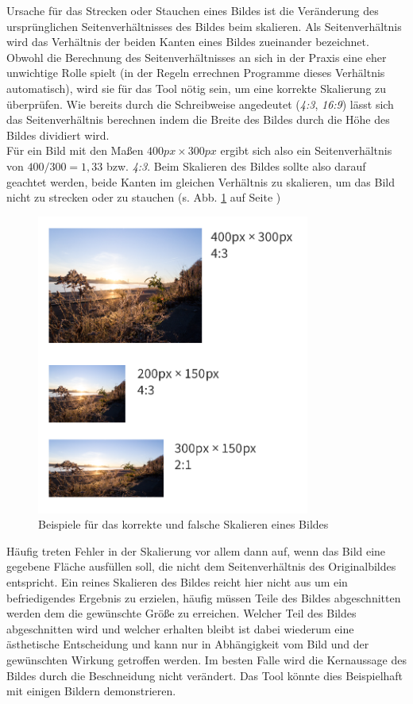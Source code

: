 Ursache für das Strecken oder Stauchen eines Bildes ist die Veränderung des ursprünglichen Seitenverhältnisses des Bildes beim skalieren.
Als Seitenverhältnis wird das Verhältnis der beiden Kanten eines Bildes zueinander bezeichnet. Obwohl die Berechnung des Seitenverhältnisses an sich in der Praxis eine eher unwichtige Rolle spielt (in der Regeln errechnen Programme dieses Verhältnis automatisch), wird sie für das Tool nötig sein, um eine korrekte Skalierung zu überprüfen.
Wie bereits durch die Schreibweise angedeutet (\textit{4:3}, \textit{16:9}) lässt sich das Seitenverhältnis berechnen indem die Breite des Bildes durch die Höhe des Bildes dividiert wird. \\
Für ein Bild mit den Maßen $400px \times 300px$ ergibt sich also ein Seitenverhältnis von \(400 / 300 = 1,33\) bzw. \textit{4:3}.
Beim Skalieren des Bildes sollte also darauf geachtet werden, beide Kanten im gleichen Verhältnis zu skalieren, um das Bild nicht zu strecken oder zu stauchen (s. Abb. \ref{fig:scaling} auf Seite \pageref{fig:scaling})

\begin{figure}[h]
    \centering
    \includegraphics[width=0.8\textwidth]{images/scaling.png}
    \caption{Beispiele für das korrekte und falsche Skalieren eines Bildes}
    \label{fig:scaling}
\end{figure}

Häufig treten Fehler in der Skalierung vor allem dann auf, wenn das Bild eine gegebene Fläche ausfüllen soll, die nicht dem Seitenverhältnis des Originalbildes entspricht.
Ein reines Skalieren des Bildes reicht hier nicht aus um ein befriedigendes Ergebnis zu erzielen, häufig müssen Teile des Bildes abgeschnitten werden dem die gewünschte Größe zu erreichen.
Welcher Teil des Bildes abgeschnitten wird und welcher erhalten bleibt ist dabei wiederum eine ästhetische Entscheidung und kann nur in Abhängigkeit vom Bild und der gewünschten Wirkung getroffen werden. Im besten Falle wird die Kernaussage des Bildes durch die Beschneidung nicht verändert. Das Tool könnte dies Beispielhaft mit einigen Bildern demonstrieren.

